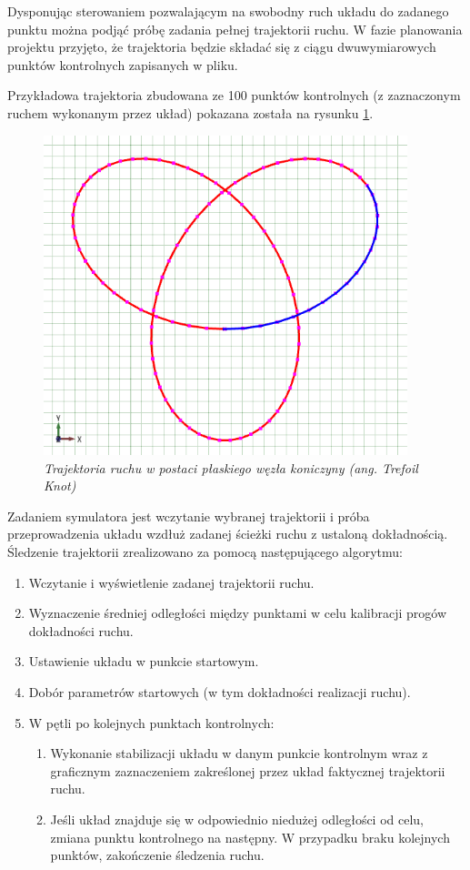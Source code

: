 \documentclass[12pt, oneside]{report}
\theoremstyle{definition}
\begin{document}
Dysponując sterowaniem pozwalającym na swobodny ruch układu do zadanego punktu można podjąć próbę zadania pełnej trajektorii ruchu. W fazie planowania projektu przyjęto, że trajektoria będzie składać się z ciągu dwuwymiarowych punktów kontrolnych zapisanych w pliku.

Przykładowa trajektoria zbudowana ze 100 punktów kontrolnych (z zaznaczonym ruchem wykonanym przez układ) pokazana została na rysunku \ref{TrajectoryTrefoilKnot}.

\begin{figure}[H]
	\centering
		\includegraphics[width = 300pt]{TrajectoryTrefoilKnot} 
		\caption{\textit{Trajektoria ruchu w postaci płaskiego węzła koniczyny (ang. Trefoil Knot)}}
		\label{TrajectoryTrefoilKnot}
\end{figure}

Zadaniem symulatora jest wczytanie wybranej trajektorii i próba przeprowadzenia układu wzdłuż zadanej ścieżki ruchu z ustaloną dokładnością. Śledzenie trajektorii zrealizowano za pomocą następującego algorytmu:
\begin{enumerate}
\item Wczytanie i wyświetlenie zadanej trajektorii ruchu.
\item Wyznaczenie średniej odległości między punktami w celu kalibracji progów dokładności ruchu.
\item Ustawienie układu w punkcie startowym.
\item Dobór parametrów startowych (w tym dokładności realizacji ruchu).
\item W pętli po kolejnych punktach kontrolnych:
\begin{enumerate}
\item Wykonanie stabilizacji układu w danym punkcie kontrolnym wraz z graficznym zaznaczeniem zakreślonej przez układ faktycznej trajektorii ruchu.
\item Jeśli układ znajduje się w odpowiednio niedużej odległości od celu, zmiana punktu kontrolnego na następny.
W przypadku braku kolejnych punktów, zakończenie śledzenia ruchu. 
\end{enumerate}
\end{enumerate}
\end{document}
